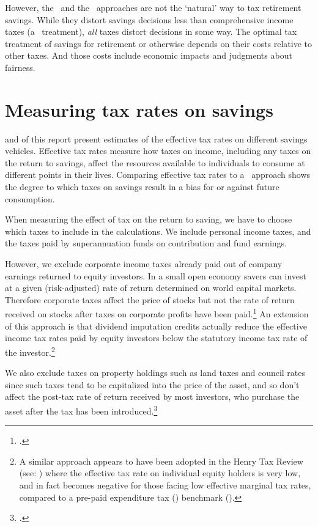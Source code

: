 \begin{subappendices}
However, the \EET\ and the \TEE\ approaches are not the ‘natural’ way to tax retirement savings. While they distort savings decisions less than comprehensive income taxes (a \TTE\ treatment), \emph{all} taxes distort decisions in some way. The optimal tax treatment of savings for retirement or otherwise depends on their costs relative to other taxes. And those costs include economic impacts and judgments about fairness.

\section{Measuring tax rates on savings}\label{appendix:SUPER-C-2}
 and  of this report present estimates of the effective tax rates on different savings vehicles. Effective tax rates measure how taxes on income, including any taxes on the return to savings, affect the resources available to individuals to consume at different points in their lives. Comparing effective tax rates to a \TEE\ approach shows the degree to which taxes on savings result in a bias for or against future consumption.

When measuring the effect of tax on the return to saving, we have to choose which taxes to include in the calculations. We include personal income taxes, and the taxes paid by superannuation funds on contribution and fund earnings. 

However, we exclude corporate income taxes already paid out of company earnings returned to equity investors. In a small open economy savers can invest at a given (risk-adjusted) rate of return determined on world capital markets. Therefore corporate taxes affect the price of stocks but not the rate of return received on stocks after taxes on corporate profits have been paid.\footcite[][7]{Wakefield2009}  An extension of this approach is that dividend imputation credits actually reduce the effective income tax rates paid by equity investors below the statutory income tax rate of the investor.\footnote{A similar approach appears to have been adopted in the Henry Tax Review (see: \textcite[][Figure~A1-19]{HenryTaxReview2010}) where the effective tax rate on individual equity holders is very low, and in fact becomes negative for those facing low effective marginal tax rates, compared to a pre-paid expenditure tax (\TEE) benchmark (\textcite[][67]{HenryTaxReview2010}).}  

We also exclude taxes on property holdings such as land taxes and council rates since such taxes tend to be capitalized into the price of the asset, and so don’t affect the post-tax rate of return received by most investors, who purchase the asset after the tax has been introduced.\footcite{DaleyCoates2015PropertyTaxes}  


\end{subappendices}